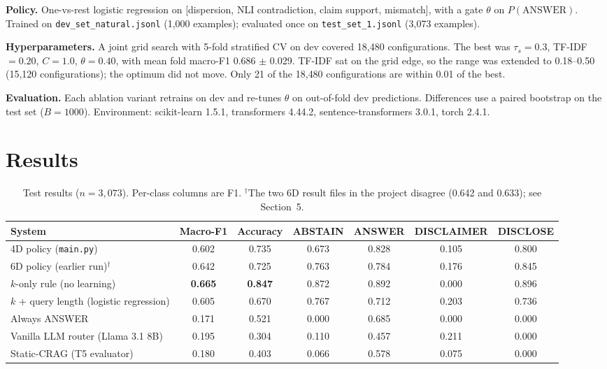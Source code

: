 \documentclass[10pt,a4paper]{article}
\newcommand{\code}[1]{\texttt{\small #1}}
\begin{document}
\textbf{Policy.} One-vs-rest logistic regression on
[dispersion, NLI contradiction, claim support, mismatch], with a gate $\theta$ on $P(\mathrm{ANSWER})$.
Trained on \code{dev\_set\_natural.jsonl} (1{,}000 examples); evaluated once on
\code{test\_set\_1.jsonl} (3{,}073 examples).

\textbf{Hyperparameters.} A joint grid search with 5-fold stratified CV on dev covered 18{,}480
configurations. The best was $\tau_s{=}0.3$, TF-IDF${=}0.20$, $C{=}1.0$, $\theta{=}0.40$, with mean
fold macro-F1 0.686 $\pm$ 0.029. TF-IDF sat on the grid edge, so the range was extended to
0.18--0.50 (15{,}120 configurations); the optimum did not move. Only 21 of the 18{,}480
configurations are within 0.01 of the best.

\textbf{Evaluation.} Each ablation variant retrains on dev and re-tunes $\theta$ on out-of-fold dev
predictions. Differences use a paired bootstrap on the test set ($B{=}1000$).
Environment: scikit-learn 1.5.1, transformers 4.44.2, sentence-transformers 3.0.1, torch 2.4.1.

\section{Results}

\begin{table}[h]
\centering\small
\caption{Test results ($n{=}3{,}073$). Per-class columns are F1. $^\dagger$The two 6D result files in
the project disagree (0.642 and 0.633); see Section~5.}
\begin{tabular}{lcccccc}
\toprule
System & Macro-F1 & Accuracy & ABSTAIN & ANSWER & DISCLAIMER & DISCLOSE \\
\midrule
4D policy (\code{main.py}) & 0.602 & 0.735 & 0.673 & 0.828 & 0.105 & 0.800 \\
6D policy (earlier run)$^\dagger$ & 0.642 & 0.725 & 0.763 & 0.784 & 0.176 & 0.845 \\
\midrule
$k$-only rule (no learning) & \textbf{0.665} & \textbf{0.847} & 0.872 & 0.892 & 0.000 & 0.896 \\
$k$ + query length (logistic regression) & 0.605 & 0.670 & 0.767 & 0.712 & 0.203 & 0.736 \\
Always ANSWER & 0.171 & 0.521 & 0.000 & 0.685 & 0.000 & 0.000 \\
\midrule
Vanilla LLM router (Llama 3.1 8B) & 0.195 & 0.304 & 0.110 & 0.457 & 0.211 & 0.000 \\
Static-CRAG (T5 evaluator) & 0.180 & 0.403 & 0.066 & 0.578 & 0.075 & 0.000 \\
\bottomrule
\end{tabular}
\end{table}
\end{document}
